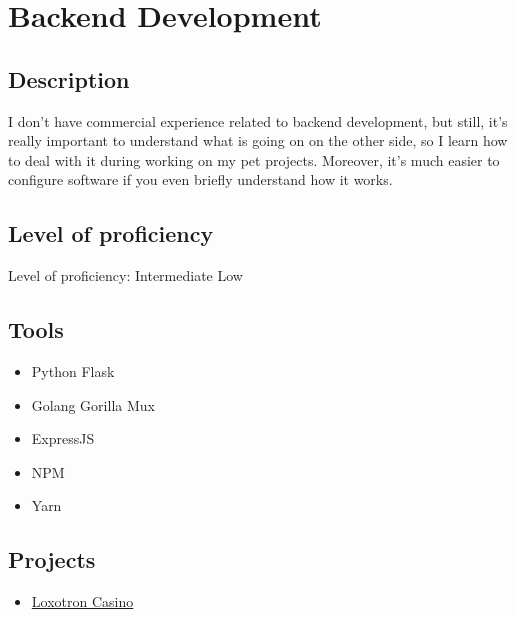 \section{Backend Development}

\subsection{Description}

I don't have commercial experience related to backend development, but still,
it's really important to understand what is going on on the other side, so I
learn how to deal with it during working on my pet projects.
Moreover, it's much easier to configure software if you even briefly understand how it works.

\subsection{Level of proficiency}

Level of proficiency: Intermediate Low

\subsection{Tools}
\begin{itemize}
    \item Python Flask
    \item Golang Gorilla Mux
    \item ExpressJS
    \item NPM
    \item Yarn
\end{itemize}

\subsection{Projects}

\begin{itemize}
    \item \hyperlink{proj_loxotron}{Loxotron Casino}
\end{itemize}

\newpage
